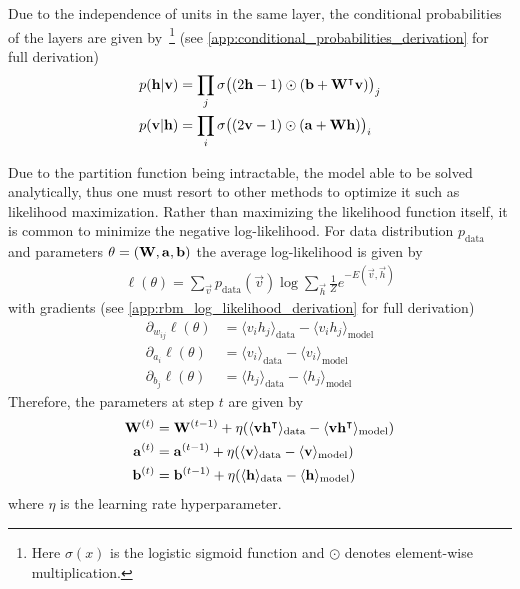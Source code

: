 Due to the independence of units in the same layer, the conditional probabilities of the layers are given by~\footnote{Here \( \sigma(x) \) is the logistic sigmoid function and \( \odot \) denotes element-wise multiplication.} (see \cref{app:conditional_probabilities_derivation} for full derivation)
\begin{align}
    p(\mathbf{h} | \mathbf{v})
        &= \prod_j \sigma\big( (2\mathbf{h} - 1) \odot (\mathbf{b} + \mathbf{W}^\intercal\mathbf{v}) \big)_j \\
    p(\mathbf{v} | \mathbf{h})
        &= \prod_i \sigma\big( (2\mathbf{v} - 1) \odot (\mathbf{a} + \mathbf{W}\mathbf{h}) \big)_i
\end{align}

Due to the partition function being intractable, the model able to be solved analytically, thus one must resort to other methods to optimize it such as likelihood maximization.
Rather than maximizing the likelihood function itself, it is common to minimize the negative log-likelihood.
For data distribution \( p_\text{data} \) and parameters \( \theta = (\mathbf{W}, \mathbf{a}, \mathbf{b}) \) the average log-likelihood is given by
\begin{align}
    \ell(\theta) = \sum_{\vec{v}} p_{\text{data}}(\vec{v}) \log \sum_\vec{h} \frac{1}{Z} e^{-E(\vec{v},\vec{h})}
\end{align}
with gradients (see \cref{app:rbm_log_likelihood_derivation} for full derivation)
\begin{align}
    \partial_{w_{ij}} \ell(\theta)
        &= \langle v_i h_j \rangle_{\text{data}} - \langle v_i h_j \rangle_{\text{model}} \\
    \partial_{a_i} \ell(\theta)
        &= \langle v_i \rangle_{\text{data}} - \langle v_i \rangle_{\text{model}} \\
    \partial_{b_j} \ell(\theta)
        &= \langle h_j \rangle_{\text{data}} - \langle h_j \rangle_{\text{model}}
\end{align}
Therefore, the parameters at step \( t \) are given by
\begin{align}
    \mathbf{W}^{(t)}
        &= \mathbf{W}^{(t-1)} + \eta(\langle \mathbf{v} \mathbf{h}^\intercal \rangle_{\text{data}} - \langle \mathbf{v} \mathbf{h}^\intercal \rangle_{\text{model}}) \\
    \mathbf{a}^{(t)}
        &= \mathbf{a}^{(t-1)} + \eta(\langle \mathbf{v} \rangle_{\text{data}} - \langle \mathbf{v} \rangle_{\text{model}}) \\
    \mathbf{b}^{(t)}
        &= \mathbf{b}^{(t-1)} + \eta(\langle \mathbf{h} \rangle_{\text{data}} - \langle \mathbf{h} \rangle_{\text{model}})
\end{align}
where \( \eta \) is the learning rate hyperparameter.

